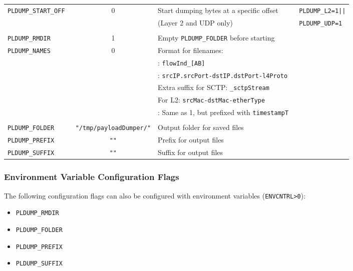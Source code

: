 \documentclass[documentation]{subfiles}
\begin{document}
\begin{longtable}{>{\tt}lcl>{\tt\small}l}
    \\
    PLDUMP\_START\_OFF  & 0 & Start dumping bytes at a specific offset                      & PLDUMP\_L2=1||\\
                        &   & (Layer 2 and UDP only)                                        & PLDUMP\_UDP=1\\
    \\
    PLDUMP\_RMDIR       & 1 & Empty {\tt\small PLDUMP\_FOLDER} before starting              & \\
    PLDUMP\_NAMES       & 0 & Format for filenames:                                         & \\
                        &   & \qquad 0: {\tt\small flowInd\_[AB]}                           & \\
                        &   & \qquad 1: {\tt\small srcIP.srcPort-dstIP.dstPort-l4Proto}     & \\
                        &   & \qquad\quad Extra suffix for SCTP: {\tt\small \_sctpStream}   & \\
                        &   & \qquad\quad For L2: {\tt\small srcMac-dstMac-etherType}       & \\
                        &   & \qquad 2: Same as 1, but prefixed with {\tt\small timestampT} & \\
    \\
    PLDUMP\_FOLDER      & {\tt\footnotesize "/tmp/payloadDumper/"}
                            & Output folder for saved files                                 & \\
    PLDUMP\_PREFIX      & {\tt\small ""}
                            & Prefix for output files                                       & \\
    PLDUMP\_SUFFIX      & {\tt\small ""}
                            & Suffix for output files                                       & \\
    \bottomrule
\end{longtable}

\subsubsection{Environment Variable Configuration Flags}
The following configuration flags can also be configured with environment variables ({\tt ENVCNTRL>0}):
\begin{itemize}
    \item {\tt PLDUMP\_RMDIR}
    \item {\tt PLDUMP\_FOLDER}
    \item {\tt PLDUMP\_PREFIX}
    \item {\tt PLDUMP\_SUFFIX}
\end{itemize}
\end{document}
